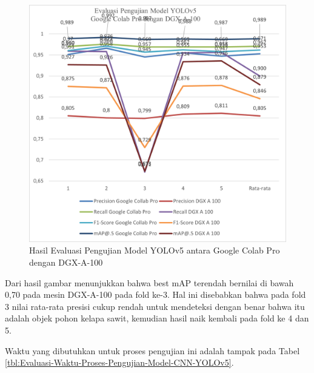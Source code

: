 \begin{figure}[H]
	\vspace{-0.1cm}
	\begin{center}
		\includegraphics[width=1\columnwidth]{bab4/Gambar/Picture28.png}
	\end{center}
	\vspace{-0.2cm}
	\captionsetup{justification=centering}
	\caption{Hasil Evaluasi Pengujian Model YOLOv5 antara Google Colab Pro dengan DGX-A-100}\label{img:Hasil-Evaluasi-Pengujian-Model-YOLOv5-Colab-DGX}
\end{figure}

Dari hasil gambar menunjukkan bahwa best mAP terendah bernilai di bawah 0,70 pada mesin DGX-A-100 pada fold ke-3. Hal ini disebabkan bahwa pada fold 3 nilai rata-rata presisi cukup rendah untuk mendeteksi dengan benar bahwa itu adalah objek pohon kelapa sawit, kemudian hasil naik kembali pada fold ke 4 dan 5.

Waktu yang dibutuhkan untuk proses pengujian ini adalah tampak pada Tabel \ref{tbl:Evaluasi-Waktu-Proses-Pengujian-Model-CNN-YOLOv5}. 

